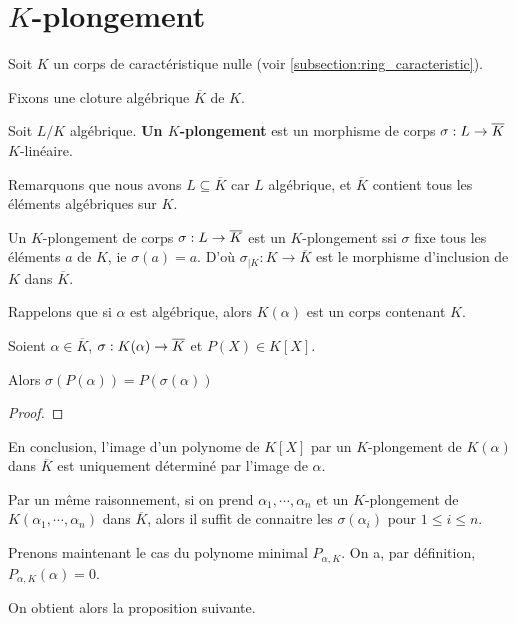 \section{$K$-plongement}

Soit $K$ un corps de caractéristique nulle (voir
\ref{subsection:ring_caracteristic}).

Fixons une cloture algébrique $\overline{K}$ de $K$.

\begin{definition}
	Soit $L/K$ algébrique.
	\textbf{Un $K$-plongement} est un morphisme de corps
	$\sigma : L \rightarrow \overline{K}$ $K$-linéaire.
\end{definition}

Remarquons que nous avons $L \subseteq \overline{K}$ car $L$ algébrique, et
$\overline{K}$ contient tous les éléments algébriques sur $K$.

Un $K$-plongement de corps $\sigma : L \rightarrow \overline{K}$ est un
$K$-plongement ssi $\sigma$ fixe tous les éléments $a$ de $K$, ie $\sigma(a) =
a$.
D'où $\sigma_{|K} : K \rightarrow \overline{K}$ est le morphisme
d'inclusion de $K$ dans $\overline{K}$.

Rappelons que si $\alpha$ est algébrique, alors $K(\alpha)$ est un corps
contenant $K$.

\begin{proposition}
	Soient $\alpha \in \overline{K}$,
	$\sigma : K(\alpha) \rightarrow \overline{K}$ et $P(X) \in K[X]$.

	Alors $\sigma(P(\alpha)) = P(\sigma(\alpha))$
\end{proposition}

\ifdefined\outputproof
\begin{proof}

\end{proof}
\fi

En conclusion, l'image d'un polynome de $K[X]$ par un $K$-plongement de
$K(\alpha)$ dans $\overline{K}$ est uniquement déterminé par l'image de
$\alpha$.

Par un même raisonnement, si on prend $\alpha_{1}, \cdots, \alpha_{n}$ et un
$K$-plongement de $K(\alpha_{1}, \cdots, \alpha_{n})$ dans $\overline{K}$, alors
il suffit de connaitre les $\sigma(\alpha_{i})$ pour $1 \leq i \leq n$.

Prenons maintenant le cas du polynome minimal $P_{\alpha, K}$.
On a, par définition, $P_{\alpha, K}(\alpha) = 0$.

On obtient alors la proposition suivante.

